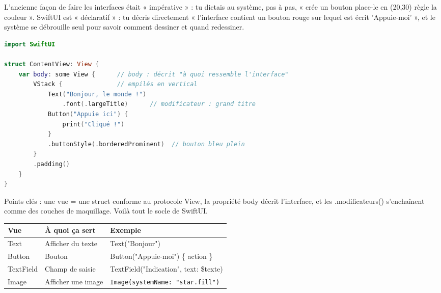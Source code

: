 


L'ancienne façon de faire les interfaces était « impérative » : tu dictais au système, pas à pas, « crée un bouton place-le en (20,30) règle la couleur ». SwiftUI est « déclaratif » : tu décris directement « l'interface contient un bouton rouge sur lequel est écrit 'Appuie-moi' », et le système se débrouille seul pour savoir comment dessiner et quand redessiner.

\begin{lstlisting}[language=Swift]
import SwiftUI

struct ContentView: View {
    var body: some View {      // body : décrit "à quoi ressemble l'interface"
        VStack {               // empilés en vertical
            Text("Bonjour, le monde !")
                .font(.largeTitle)      // modificateur : grand titre
            Button("Appuie ici") {
                print("Cliqué !")
            }
            .buttonStyle(.borderedProminent)  // bouton bleu plein
        }
        .padding()
    }
}
\end{lstlisting}

Points clés : une vue = une struct conforme au protocole View, la propriété body décrit l'interface, et les .modificateurs() s'enchaînent comme des couches de maquillage. Voilà tout le socle de SwiftUI.


\begin{center}
\begin{tabularx}{\linewidth}{|X|X|X|}
\hline
\textbf{Vue} & \textbf{À quoi ça sert} & \textbf{Exemple} \tabularnewline
\hline
Text & Afficher du texte & Text("Bonjour") \tabularnewline
Button & Bouton & Button("Appuie-moi") \{ action \} \tabularnewline
TextField & Champ de saisie & TextField("Indication", text: \$texte) \tabularnewline
Image & Afficher une image & \texttt{Image(systemName: "star.\allowbreak fill")} \tabularnewline
\hline
\end{tabularx}
\end{center}

